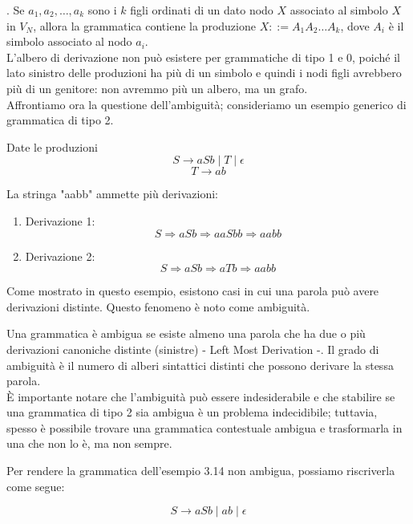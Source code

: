 \documentclass{article}
\begin{document}
. Se \( a_1, a_2, \ldots, a_k \) sono i \( k \) figli ordinati di un dato nodo \( X \) associato al simbolo \( X \) in \( V_N \), allora la grammatica contiene la produzione \( X ::= A_1 A_2 \ldots A_k \), dove \( A_i \) è il simbolo associato al nodo \( a_i \).
\\\noindent
L'albero di derivazione non può esistere per grammatiche di tipo 1 e 0, poiché il lato sinistro delle produzioni ha più di un simbolo e quindi i nodi figli avrebbero più di un genitore: non avremmo più un albero, ma un grafo.
\\\noindent
Affrontiamo ora la questione dell'ambiguità; consideriamo un esempio generico di grammatica di tipo 2.
\begin{example}
Date le produzioni
\[
S \rightarrow aSb \;|\; T \;|\; \epsilon
\]
\[
T \rightarrow ab
\]

La stringa "aabb" ammette più derivazioni:

\begin{enumerate}
    \item Derivazione 1:
    \[
    S \Rightarrow aSb \Rightarrow aaSbb \Rightarrow aabb
    \]
    
    \item Derivazione 2:
    \[
    S \Rightarrow aSb \Rightarrow aTb \Rightarrow aabb
    \]
\end{enumerate} 
\end{example}
\noindent Come mostrato in questo esempio, esistono casi in cui una parola può avere derivazioni distinte. Questo fenomeno è noto come ambiguità.
\\\noindent 
\begin{definition}
Una grammatica è ambigua se esiste almeno una parola che ha due o più derivazioni canoniche distinte (sinistre) - Left Most Derivation -. Il grado di ambiguità è il numero di alberi sintattici distinti che possono derivare la stessa parola.\\È importante notare che l'ambiguità può essere indesiderabile e che stabilire se una grammatica di tipo 2 sia ambigua è un problema indecidibile; tuttavia, spesso è possibile trovare una grammatica contestuale ambigua e trasformarla in una che non lo è, ma non sempre.
\end{definition}
\begin{example}
Per rendere la grammatica dell'esempio 3.14 non ambigua, possiamo riscriverla come segue:

\[
S \rightarrow aSb \;|\; ab \;|\; \epsilon
\]
\end{example}
\end{document}
